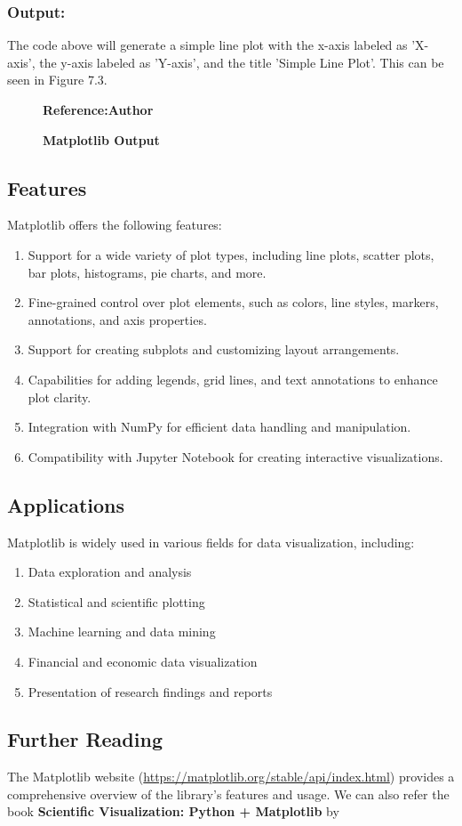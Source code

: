 \subsubsection{Output:}

The code above will generate a simple line plot with the x-axis labeled as 'X-axis', the y-axis labeled as 'Y-axis', and the title 'Simple Line Plot'. This can be seen in Figure 7.3.

	\begin{figure}
	\centering
	\caption{\textbf{Matplotlib Output}}
	\footnotesize \textbf{Reference:Author}
	\label{fig:Matplotlib Output}
\end{figure}

\subsection{Features}

Matplotlib offers the following features:

\begin{enumerate}
	\item Support for a wide variety of plot types, including line plots, scatter plots, bar plots, histograms, pie charts, and more.
	\item Fine-grained control over plot elements, such as colors, line styles, markers, annotations, and axis properties.
	\item Support for creating subplots and customizing layout arrangements.
	\item Capabilities for adding legends, grid lines, and text annotations to enhance plot clarity.
	\item Integration with NumPy for efficient data handling and manipulation.
	\item Compatibility with Jupyter Notebook for creating interactive visualizations.
\end{enumerate}

\subsection{Applications}

Matplotlib is widely used in various fields for data visualization, including:

\begin{enumerate}
	\item Data exploration and analysis
	\item Statistical and scientific plotting
	\item Machine learning and data mining
	\item Financial and economic data visualization
	\item Presentation of research findings and reports
\end{enumerate}

\subsection{Further Reading}

The Matplotlib website (\url{https://matplotlib.org/stable/api/index.html}) provides a comprehensive overview of the library's features and usage. We can also refer the book \textbf{Scientific Visualization: Python + Matplotlib} by \cite{rougier:2021}



